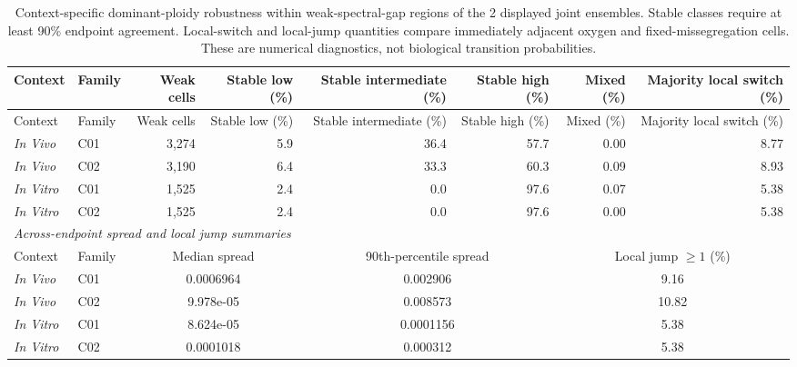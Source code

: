 \begingroup
\scriptsize
\setlength{\tabcolsep}{3pt}
\renewcommand{\arraystretch}{0.90}
\begin{longtable}{@{}llrrrrrr@{}}
\caption{Context-specific dominant-ploidy robustness within weak-spectral-gap regions of the 2 displayed joint ensembles. Stable classes require at least 90\% endpoint agreement. Local-switch and local-jump quantities compare immediately adjacent oxygen and fixed-missegregation cells. These are numerical diagnostics, not biological transition probabilities.}\label{tab:weak_gap_summary}\\
\toprule
Context & Family & Weak cells & Stable low (\%) & Stable intermediate (\%) & Stable high (\%) & Mixed (\%) & Majority local switch (\%) \\
\midrule
\endfirsthead
\toprule
Context & Family & Weak cells & Stable low (\%) & Stable intermediate (\%) & Stable high (\%) & Mixed (\%) & Majority local switch (\%) \\
\midrule
\endhead
\textit{In Vivo} & C01 & 3,274 & 5.9 & 36.4 & 57.7 & 0.00 & 8.77 \\
\textit{In Vivo} & C02 & 3,190 & 6.4 & 33.3 & 60.3 & 0.09 & 8.93 \\
\textit{In Vitro} & C01 & 1,525 & 2.4 & 0.0 & 97.6 & 0.07 & 5.38 \\
\textit{In Vitro} & C02 & 1,525 & 2.4 & 0.0 & 97.6 & 0.00 & 5.38 \\
\midrule
\multicolumn{8}{l}{\textit{Across-endpoint spread and local jump summaries}} \\
Context & Family & \multicolumn{2}{c}{Median spread} & \multicolumn{2}{c}{90th-percentile spread} & \multicolumn{2}{c}{Local jump $\geq1$ (\%)} \\
\textit{In Vivo} & C01 & \multicolumn{2}{c}{0.0006964} & \multicolumn{2}{c}{0.002906} & \multicolumn{2}{c}{9.16} \\
\textit{In Vivo} & C02 & \multicolumn{2}{c}{9.978e-05} & \multicolumn{2}{c}{0.008573} & \multicolumn{2}{c}{10.82} \\
\textit{In Vitro} & C01 & \multicolumn{2}{c}{8.624e-05} & \multicolumn{2}{c}{0.0001156} & \multicolumn{2}{c}{5.38} \\
\textit{In Vitro} & C02 & \multicolumn{2}{c}{0.0001018} & \multicolumn{2}{c}{0.000312} & \multicolumn{2}{c}{5.38} \\
\bottomrule
\end{longtable}
\endgroup
